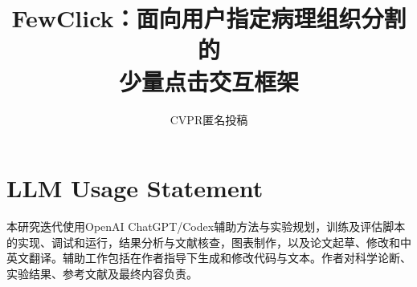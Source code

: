 \documentclass[10pt,twocolumn,letterpaper]{article}
\title{FewClick：面向用户指定病理组织分割的\\少量点击交互框架}
\author{CVPR匿名投稿}
\begin{document}
\maketitle






\label{page:main-end}
\clearpage
\section*{LLM Usage Statement}
本研究迭代使用OpenAI ChatGPT/Codex辅助方法与实验规划，训练及评估脚本的实现、调试和运行，结果分析与文献核查，图表制作，以及论文起草、修改和中英文翻译。辅助工作包括在作者指导下生成和修改代码与文本。作者对科学论断、实验结果、参考文献及最终内容负责。

{\small}
\end{document}
